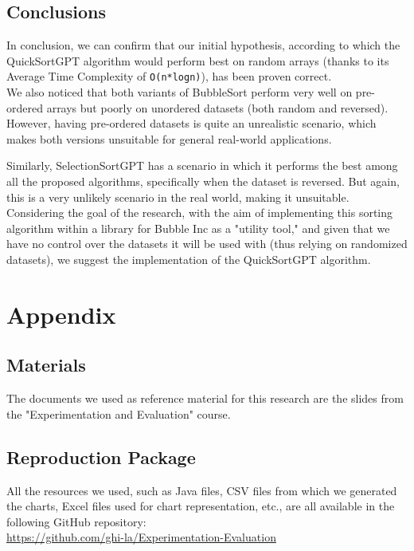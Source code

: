 \documentclass{article}
\begin{document}
    \subsection{Conclusions}
    In conclusion, we can confirm that our initial hypothesis, according to which the QuickSortGPT algorithm would perform best on random arrays (thanks to its Average Time Complexity of \texttt{O(n*logn)}), has been proven correct.\\
    
    We also noticed that both variants of BubbleSort perform very well on pre-ordered arrays but poorly on unordered datasets (both random and reversed). However, having pre-ordered datasets is quite an unrealistic scenario, which makes both versions unsuitable for general real-world applications.
    
    Similarly, SelectionSortGPT has a scenario in which it performs the best among all the proposed algorithms, specifically when the dataset is reversed. But again, this is a very unlikely scenario in the real world, making it unsuitable.\\
    
    Considering the goal of the research, with the aim of implementing this sorting algorithm within a library for Bubble Inc as a "utility tool," and given that we have no control over the datasets it will be used with (thus relying on randomized datasets), we suggest the implementation of the QuickSortGPT algorithm.

\newpage

\section{Appendix}\label{chap:appendix}
    \subsection{Materials}
    The documents we used as reference material for this research are the slides from the "Experimentation and Evaluation" course.

    \subsection{Reproduction Package}
    All the resources we used, such as Java files, CSV files from which we generated the charts, Excel files used for chart representation, etc., are all available in the following GitHub repository: \\
    \url{https://github.com/ghi-la/Experimentation-Evaluation}
    
\end{document}
